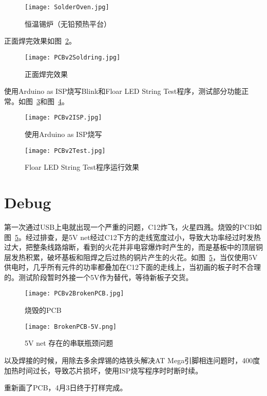\begin{figure}[htbp]
    \centering
    \texttt{[image: SolderOven.jpg]}
    \caption{恒温锡炉（无铅预热平台）}
    \label{fig:SolderOven}
\end{figure}


正面焊完效果如图~\ref{fig:PCBv2Soldring}。

\begin{figure}[htbp]
    \centering
    \texttt{[image: PCBv2Soldring.jpg]}
    \caption{正面焊完效果}
    \label{fig:PCBv2Soldring}
\end{figure}

使用Arduino as ISP烧写Blink和Floar LED String Test程序，测试部分功能正常。如图~\ref{fig:PCBv2ISP}和图~\ref{fig:PCBv2Test}。

\begin{figure}[htbp]
    \centering
    \texttt{[image: PCBv2ISP.jpg]}
    \caption{使用Arduino as ISP烧写}
    \label{fig:PCBv2ISP}
\end{figure}

\begin{figure}[htbp]
    \centering
    \texttt{[image: PCBv2Test.jpg]}
    \caption{Floar LED String Test程序运行效果}
    \label{fig:PCBv2Test}
\end{figure}

\section{Debug}

第一次通过USB上电就出现一个严重的问题，C12炸飞，火星四溅。烧毁的PCB如图~\ref{fig:BrokenPCB}。经过排查，是5V net经过C12下方的走线宽度过小，导致大功率经过时发热过大，把整条线路熔断，看到的火花并非电容爆炸时产生的，而是基板中的顶层铜层发热积累，破坏基板和阻焊之后过热的铜片产生的火花。如图~\ref{fig:BrokenPCB}，当仅使用5V供电时，几乎所有元件的功率都叠加在C12下面的走线上，当初画的板子时不合理的。测试阶段暂时外接一个5V作为替代，等待新板子交货。

\begin{figure}[htbp]
    \centering
    \texttt{[image: PCBv2BrokenPCB.jpg]}
    \caption{烧毁的PCB}
    \label{fig:BrokenPCB}
\end{figure}

\begin{figure}[htbp]
    \centering
    \texttt{[image: BrokenPCB-5V.png]}
    \caption{5V net 存在的串联瓶颈问题}
    \label{fig:BrokenPCB-Illumination}
\end{figure}

以及焊接的时候，用除去多余焊锡的烙铁头解决AT Mega引脚相连问题时，400度加热时间过长，导致芯片损坏，使用ISP烧写程序时时断时续。

重新画了PCB，4月3日终于打样完成。